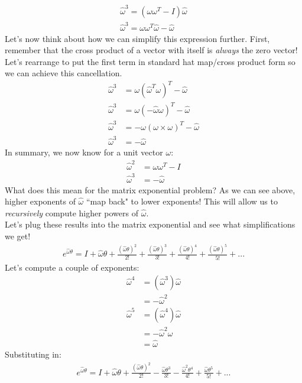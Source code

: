 \documentclass[oneside]{book}
\begin{document}
\begin{align}
    \hat\omega^3 = (\omega\omega^T - I)\hat\omega\\
     \hat\omega^3 = \omega\omega^T\hat\omega - \hat\omega
\end{align}
Let's now think about how we can simplify this expression further. First, remember that the cross product of a vector with itself is \textit{always} the zero vector!\\
Let's rearrange to put the first term in standard hat map/cross product form so we can achieve this cancellation.
\begin{align}
    \hat\omega^3 &= \omega(\hat\omega^T \omega)^T - \hat\omega\\
    \hat\omega^3 &= \omega(-\hat\omega \omega)^T - \hat\omega\\
    \hat\omega^3 &= -\omega(\omega \times \omega)^T - \hat\omega\\
    \hat\omega^3 &= -\hat\omega
\end{align}
In summary, we now know for a unit vector $\omega$:
\begin{align}
    \hat\omega^2 &= \omega\omega^T - I\\
    \hat\omega^3 &= -\hat\omega
\end{align}
What does this mean for the matrix exponential problem? As we can see above, higher exponents of $\hat\omega$ ``map back" to lower exponents! This will allow us to \textit{recursively} compute higher powers of $\hat\omega$.\\
Let's plug these results into the matrix exponential and see what simplifications we get!\\
\begin{align}
    e^{\hat\omega \theta} = I + \hat\omega \theta + \frac{(\hat\omega \theta)^2}{2!} + \frac{(\hat\omega \theta)^3}{3!} + \frac{(\hat\omega \theta)^4}{4!} + \frac{(\hat\omega \theta)^5}{5!} + ...
\end{align}
Let's compute a couple of exponents:
\begin{align}
    \hat\omega^4 &= (\hat\omega^3)\hat\omega\\
    &= -\hat\omega^2\\
    \hat\omega^5 &= (\hat\omega^4)\hat\omega\\
    &= -\hat\omega^2\hat\omega\\
    &= \hat\omega
\end{align}
Substituting in:
\begin{align}
     e^{\hat\omega \theta} = I + \hat\omega \theta + \frac{(\hat\omega \theta)^2}{2!} - \frac{\hat\omega \theta^3}{3!} - \frac{\hat\omega^2 \theta^4}{4!} + \frac{\hat\omega \theta^5}{5!} + ...
\end{align}
\end{document}
